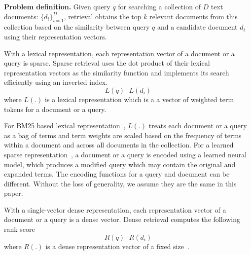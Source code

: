 {\bf Problem definition.}
Given query $q$ for searching a collection of $D$ text documents:   $ \{d_i\}^D_{i=1}$, 
retrieval  obtains the top $k$ relevant documents from this collection based on
the similarity between query $q$ and a candidate document  $d_i$ using  their
representation vectors.

With a lexical representation, each  representation vector of a document or a query is sparse.
Sparse retrieval uses  the dot product of their lexical representation vectors as the similarity function
and implements its search efficiently using an inverted index. 
\begin{equation}
\label{eq:sparseretrieval}
L(q) \cdot  L(d_i)
\end{equation}
where $L(.)$ is a lexical representation   which is a a vector of weighted term tokens for a document or a query.

For BM25 based lexical representation~\cite{Robertson2009BM25}, 
$L(.)$ treats each document or a query as a bag of terms
and term weights are scaled based on the frequency of terms within a document and across all documents in the collection.
For a learned sparse representation~\cite{Dai2020deepct, Mallia2021deepimpact, Lin2021unicoil,2021NAACL-Gao-COIL}, 
a document or a query is encoded using  a learned neural model, which
produces a modified query which may contain the original and expanded terms.
The encoding functions for a query and document can be different. Without the loss of generality, we assume they are the same in this paper.

With a single-vector dense  representation, each  representation vector of a document or a query is a dense vector. 
Dense retrieval computes the following rank score
\begin{equation}
\label{eq:denseretrieval}
R(q) \cdot  R(d_i)
\end{equation}
where $R(.)$ is a dense representation vector  of a fixed size~\cite{Karpukhin2020DPR}.


